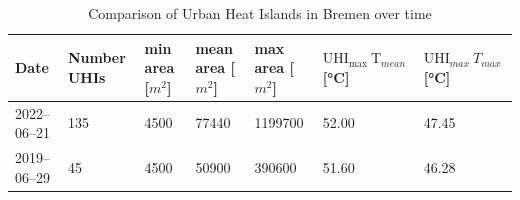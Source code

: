 \documentclass[12pt,a4paper, english,twoside]{article}
\begin{document}
\begin{landscape}
    \begin{table}[ht]
      \renewcommand{\arraystretch}{1.4}
      \centering
      \caption{Comparison of Urban Heat Islands in Bremen over time \label{tab:statsBremen}}
      \begin{tabular}{l lll lll}
        \toprule
        \textbf{Date}& Number UHIs & min area [$m^2$]& mean area [$m^2$]& max area [$m^2$]& $\text{UHI}_{\text{max}}~\text{T}_{mean}$ [°C]& $\text{UHI}_{max}~T_{max}$ [°C]\\
             \midrule
        2022--06--21 & 135 & 4500 & 77440 & 1199700 &52.00 & 47.45 \\ 
        2019--06--29 &  45 & 4500 & 50900 &  390600 & 51.60 & 46.28  \\
        \bottomrule
      \end{tabular}
    \end{table}

\end{landscape}
\end{document}
